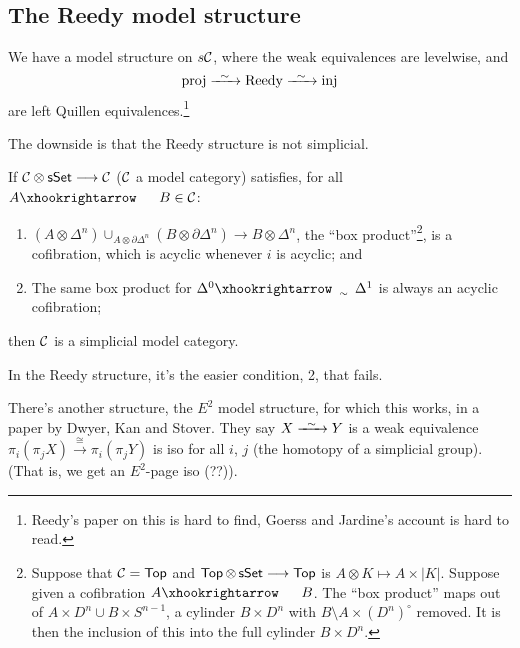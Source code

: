 \documentclass[11pt]{article}
\begin{document}
\begin{InnaSimplicalModelCats}
\subsection*{The Reedy model structure}
\begin{thm*}
We have a model structure on $s\mathcal{C}$, where the weak equivalences are levelwise, and
\[\textup{proj}\weakequiv\textup{Reedy}\weakequiv\textup{inj}\]
are left Quillen equivalences.\footnote{Reedy's paper on this is hard to find, Goerss and Jardine's account is hard to read.}
\end{thm*}
\noindent The downside is that the Reedy structure is not simplicial.
\begin{thm*}
If $\mathcal{C}\otimes \operatorname{{\mathsf{sSet}}}\longrightarrow \mathcal{C}$ ($\mathcal{C}$ a model category) satisfies, for all $A\cofibration B\in\calC$:
\begin{enumerate}\squishlist
\item $(A\otimes \Delta^n)\cup_{A\otimes\partial\Delta^n}(B\otimes\partial\Delta^n)\to B\otimes\Delta^n$, the ``box product''\footnote{Suppose that $\mathcal{C}=\operatorname{{\mathsf{Top}}}$ and $\operatorname{{\mathsf{Top}}}\otimes\operatorname{{\mathsf{sSet}}}\longrightarrow\operatorname{{\mathsf{Top}}}$ is $A\otimes K\mapsto A\times|K|$. Suppose given a cofibration $A\cofibration B$. The ``box product'' maps out of $A\times D^n\cup B\times S^{n-1}$, a cylinder $B\times D^n$ with $B\setminus A\times (D^n)^\circ$ removed. It is then the inclusion of this into the full cylinder $B\times D^n$. }, is a cofibration, which is acyclic whenever $i$ is acyclic; and
\item The same box product for $\Delta^0\acycliccofibration\Delta^1$ is always an acyclic cofibration;
\end{enumerate}
then $\mathcal{C}$ is a simplicial model category.
\end{thm*}
\noindent In the Reedy structure, it's the easier condition, 2, that fails.

There's another structure, the $E^2$ model structure, for which this works, in a paper by Dwyer, Kan and Stover. They say $X\weakequiv Y$ is a weak equivalence \Iff $\pi_i(\pi_j X)\overset{\cong}{\to}\pi_i(\pi_j  Y)$ is iso for all $i$, $j$ (the homotopy of a simplicial group). (That is, we get an $E^2$-page iso (??)).

\end{InnaSimplicalModelCats}
\end{document}
